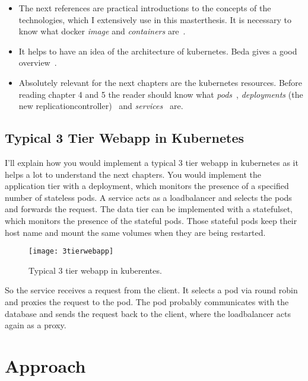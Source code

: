 \begin{itemize}

\item The next references are practical introductions to the concepts of the technologies,
  which I extensively use in this masterthesis. It is necessary to know what docker
  \emph{image} and \emph{containers}
  are~\cite{docker_orientation}\cite{docker_orientation2}.

\item It helps to have an idea of the architecture of kubernetes. Beda gives a good
  overview~\cite{kubernetes_architecture2}.

\item Absolutely relevant for the next chapters are the kubernetes resources. Before
  reading chapter 4 and 5 the reader should know what \emph{pods}~\cite{pod},
  \emph{deployments} (the new replicationcontroller)~\cite{replicationcontroller} and
  \emph{services}~\cite{service} are.

\end{itemize}

\section{Typical 3 Tier Webapp in Kubernetes}

I'll explain how you would implement a typical 3 tier webapp in kubernetes as it helps a
lot to understand the next chapters. You would implement the application tier with a
deployment, which monitors the presence of a specified number of stateless pods. A service
acts as a loadbalancer and selects the pods and forwards the request. The data tier can be
implemented with a statefulset, which monitors the presence of the stateful pods. Those
stateful pods keep their host name and mount the same volumes when they are being
restarted.

\begin{figure}[htbp]
  \centering
  \texttt{[image: 3tierwebapp]}
  \caption[3tierwebapp]{Typical 3 tier webapp in kuberentes.}
  \label{fig:3tierwebapp}
\end{figure}

So the service receives a request from the client. It selects a pod via round robin and
proxies the request to the pod. The pod probably communicates with the database and sends
the request back to the client, where the loadbalancer acts again as a proxy.

\chapter{Approach}

